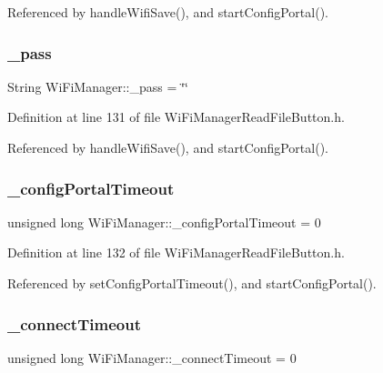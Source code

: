 Referenced by handle\+Wifi\+Save(), and start\+Config\+Portal().

\mbox{\label{class_wi_fi_manager_a7486c2c0b67884ea872a4fe56d3450b2}} 
\subsubsection{\texorpdfstring{\+\_\+pass}{\_pass}}
{\footnotesize\ttfamily String Wi\+Fi\+Manager\+::\+\_\+pass = \char`\"{}\char`\"{}\hspace{0.3cm}{\ttfamily [private]}}



Definition at line 131 of file Wi\+Fi\+Manager\+Read\+File\+Button.\+h.



Referenced by handle\+Wifi\+Save(), and start\+Config\+Portal().

\mbox{\label{class_wi_fi_manager_ae6c969ba67e0a029dcde1c3511ca79b7}} 
\subsubsection{\texorpdfstring{\+\_\+config\+Portal\+Timeout}{\_configPortalTimeout}}
{\footnotesize\ttfamily unsigned long Wi\+Fi\+Manager\+::\+\_\+config\+Portal\+Timeout = 0\hspace{0.3cm}{\ttfamily [private]}}



Definition at line 132 of file Wi\+Fi\+Manager\+Read\+File\+Button.\+h.



Referenced by set\+Config\+Portal\+Timeout(), and start\+Config\+Portal().

\mbox{\label{class_wi_fi_manager_a6c03ca5d418b4d46e9a6d751a902184c}} 
\subsubsection{\texorpdfstring{\+\_\+connect\+Timeout}{\_connectTimeout}}
{\footnotesize\ttfamily unsigned long Wi\+Fi\+Manager\+::\+\_\+connect\+Timeout = 0\hspace{0.3cm}{\ttfamily [private]}}



